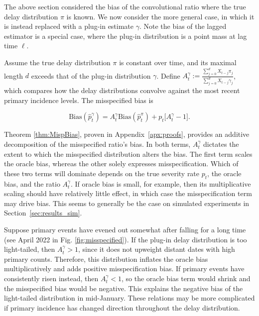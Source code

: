 \documentclass{article}
\begin{document}
The above section considered the bias of the convolutional ratio where the true delay distribution $\pi$ is known. We now consider the more general case, in which it is instead replaced with a plug-in estimate $\gamma$. Note the bias of the lagged estimator is a special case, where the plug-in distribution is a point mass at lag time $\ell$. 

\begin{theorem}\label{thm:MispBias}
Assume the true delay distribution $\pi $ is constant over time, and its maximal length $d$ exceeds that of the plug-in distribution $\gamma$. 
Define $A_t^\gamma := \frac{\sum_{j=0}^d X_{t-j}\pi_j}{\sum_{j=0}^d X_{t-j}\gamma_j}$, which compares how the delay distributions convolve against the most recent primary incidence levels. The misspecified bias is

\begin{equation*}
          \text{Bias}(\hat{p}_t^\gamma) = A_t^\gamma\text{Bias}(\hat{p}_t^\pi) + p_t\big[ A_t^\gamma-1\big].
\end{equation*}
\end{theorem}

Theorem \ref{thm:MispBias}, proven in Appendix~\ref{apx:proofs}, provides an additive decomposition of the misspecified ratio's bias. In both terms, $A_t^\gamma$ dictates the extent to which the misspecified distribution alters the bias. The first term scales the oracle bias, whereas the other solely expresses misspecification. Which of these two terms will dominate depends on the true severity rate $p_t$, the oracle bias, and the ratio $A_t^\gamma$. If oracle bias is small, for example, then its multiplicative scaling should have relatively little effect, in which case the misspecification term may drive bias. This seems to generally be the case on simulated experiments in Section~\ref{sec:results_sim}.

Suppose primary events have evened out somewhat after falling for a long time (see April 2022 in Fig. \ref{fig:misspecified}). If the plug-in delay distribution is too light-tailed, then $A_t^\gamma>1$, since it does not upweight distant dates with high primary counts. Therefore, this distribution inflates the oracle bias multiplicatively and adds positive misspecification bias. If primary events have consistently risen instead, then $A_t^\gamma < 1$, so the oracle bias term would shrink and the misspecified bias would be negative. This explains the negative bias of the light-tailed distribution in mid-January.  These relations may be more complicated if primary incidence has changed direction throughout the delay distribution.
\end{document}
